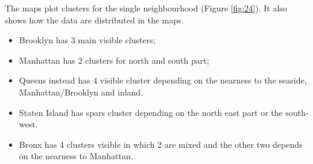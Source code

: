 \documentclass{FR16}
\begin{document}
\newpage
\noindent The maps plot clusters for the single neighbourhood (Figure \ref{fig:24}). It also shows how the data are distributed  in the maps. 
\begin{itemize}
\itemsep0em 
\item Brooklyn has 3 main visible clusters;
\item Manhattan has 2 clusters for north and south part; 
\item Queens instead has 4 visible cluster depending on the nearness to the seaside, Manhattan/Brooklyn and inland. 
\item Staten Island has spars cluster depending on the north east part or the south-west.
\item Bronx has 4 clusters visible in which 2 are mixed and the other two depends on the nearness to Manhattan.
\end{itemize}
\end{document}
